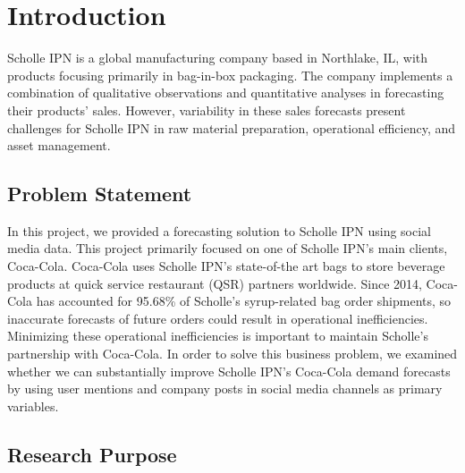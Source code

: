 \documentclass[12pt,oneside]{chicagocapstone}
\begin{document}
  \hypersetup{linkcolor=black}
  \setcounter{tocdepth}{2}
  \tableofcontents

  \listoffigures

  \listoftables


\mainmatter %
\pagestyle{fancyplain} %

\hypertarget{introduction}{%
\chapter*{Introduction}\label{introduction}}

Scholle IPN is a global manufacturing company based in Northlake, IL, with products focusing primarily in bag-in-box packaging. The company implements a combination of qualitative observations and quantitative analyses in forecasting their products' sales. However, variability in these sales forecasts present challenges for Scholle IPN in raw material preparation, operational efficiency, and asset management.

\hypertarget{problem-statement}{%
\section*{Problem Statement}\label{problem-statement}}

In this project, we provided a forecasting solution to Scholle IPN using social media data. This project primarily focused on one of Scholle IPN's main clients, Coca-Cola. Coca-Cola uses Scholle IPN's state-of-the art bags to store beverage products at quick service restaurant (QSR) partners worldwide. Since 2014, Coca-Cola has accounted for 95.68\% of Scholle's syrup-related bag order shipments, so inaccurate forecasts of future orders could result in operational inefficiencies. Minimizing these operational inefficiencies is important to maintain Scholle's partnership with Coca-Cola. In order to solve this business problem, we examined whether we can substantially improve Scholle IPN's Coca-Cola demand forecasts by using user mentions and company posts in social media channels as primary variables.

\hypertarget{research-purpose}{%
\section*{Research Purpose}\label{research-purpose}}
\end{document}
